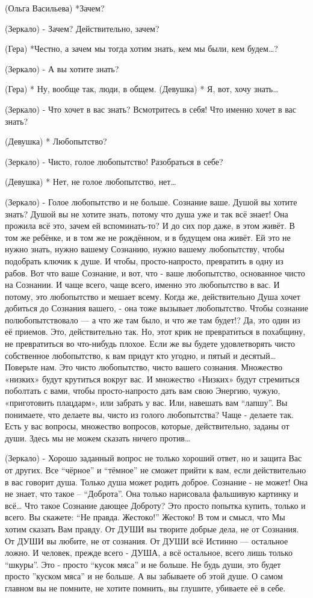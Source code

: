 (Ольга Васильева) *Зачем?

(Зеркало) - Зачем? Действительно, зачем?

(Гера) *Честно, а зачем мы тогда хотим знать, кем мы были, кем будем…? 

(Зеркало) - А вы хотите знать? 

(Гера) * Ну, вообще так, люди, в общем.
(Девушка) * Я, вот, хочу знать…

(Зеркало) - Что хочет в вас знать? Всмотритесь в себя! Что именно хочет в вас знать? 

(Девушка) * Любопытство?

(Зеркало) - Чисто, голое любопытство! Разобраться в себе?

(Девушка) * Нет, не голое любопытство, нет…

(Зеркало) - Голое любопытство и не больше. Сознание ваше. Душой вы хотите знать? Душой вы не хотите знать, потому что душа уже и так всё знает! Она прожила всё это, зачем ей вспоминать-то? И до сих пор даже, в этом живёт. В том же ребёнке, и в том же не рождённом, и в будущем она живёт. Ей это не нужно знать, нужно вашему Сознанию, нужно вашему любопытству, чтобы подобрать ключик к душе. И чтобы, просто-напросто, превратить в одну из рабов. Вот что ваше Сознание, и вот, что - ваше любопытство, основанное чисто на Сознании. И чаще всего, чаще всего, именно это любопытство в вас. И потому, это любопытство и мешает всему. Когда же, действительно Душа хочет добиться до Сознания вашего, - она тоже вызывает любопытство. Чтобы сознание полюбопытствовало — а что же там было, и что же там будет!?  Да, это один из её приемов. Это, действительно так. Но, этот крик не превратиться в похабщину, не превратиться во что-нибудь плохое. Если же вы будете удовлетворять чисто собственное любопытство, к вам придут кто угодно, и пятый и десятый… Поверьте нам. Это чисто любопытство, чисто вашего сознания. Множество «низких» будут крутиться вокруг вас. И множество «Низких» будут стремиться поболтать с вами, чтобы просто-напросто дать вам свою Энергию, чужую, «приготовить плацдарм», или забрать у вас. Или, навешать вам “лапшу”. Вы понимаете, что делаете вы, чисто из голого любопытства? Чаще - делаете так. Есть у вас вопросы, множество вопросов, которые, действительно, заданы от души. Здесь мы не можем сказать ничего против…

(Зеркало) - Хорошо заданный вопрос не только хороший ответ, но и защита Вас от других. Все “чёрное” и “тёмное” не сможет прийти к вам, если действительно в вас говорит душа. Только душа может родить доброе. Сознание - не может! Она не знает, что такое – “Доброта”. Она только нарисовала фальшивую картинку и всё… Что такое Сознание дающее Доброту? Это просто попытка купить, только и всего. Вы скажете: “Не правда. Жестоко!” Жестоко! В том и смысл, что Мы хотим сказать Вам правду.  От ДУШИ вы творите добрые дела, не от Сознания. От ДУШИ вы любите, не от сознания. От ДУШИ всё Истинно — остальное ложно. И человек, прежде всего - ДУША, а всё остальное, всего лишь только “шкуры”. Это - просто “кусок мяса” и не больше. Не будь души,  это будет просто ”куском мяса” и не больше. А вы забываете об этой душе. О самом главном вы не помните, не хотите помнить, вы глушите, убиваете её в себе.

